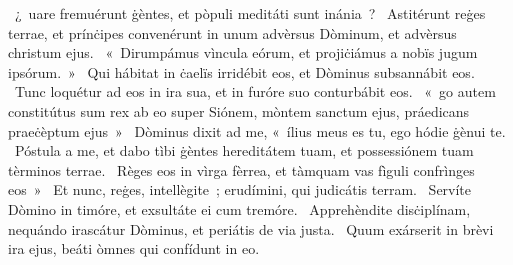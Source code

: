 {%
~¿~uare fremuérunt ġèntes, et pòpuli meditáti sunt inánia~?
~Astitérunt reġes terrae, et prínċipes convenérunt in unum advèrsus Dòminum, et advèrsus christum ejus.
~«~Dirumpámus vìncula eórum, et projiċiámus a nobïs jugum ipsórum.~»
~Qui hábitat in ċaelïs irridébit eos, et Dòminus subsannábit eos.
~Tunc loquétur ad eos in ira sua, et in furóre suo conturbábit eos.
~«~go autem constitútus sum rex ab eo super Siónem, mòntem sanctum ejus, práedicans praeċèptum ejus~»
~Dòminus dixit ad me, «~ílius meus es tu, ego hódie ġènui te.
~Póstula a me, et dabo tìbi ġèntes hereditátem tuam, et possessiónem tuam tèrminos terrae.
~Règes eos in vìrga fèrrea, et tàmquam vas fìguli confrìnges eos~»
~Et nunc, reġes, intellègite~; erudímini, qui judicátis terram.
~Servíte Dòmino in timóre, et exsultáte ei cum tremóre.
~Apprehèndite disċiplínam, nequándo irascátur Dòminus, et periátis de via justa.
~Quum exárserit in brèvi ira ejus, beáti òmnes qui confídunt in eo.
}
